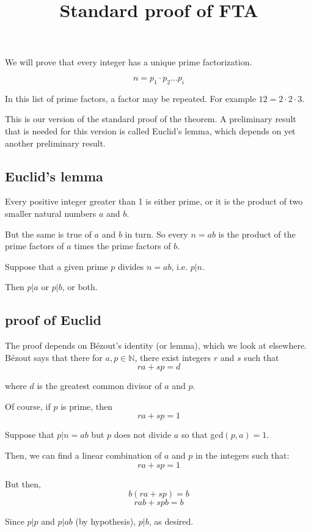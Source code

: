 \documentclass[11pt, oneside]{article}
\title{Standard proof of FTA}
\date{}
\begin{document}
\maketitle
\Large

We will prove that every integer has a unique prime factorization.

\[ n = p_1 \cdot p_2 \dots p_i \]

In this list of prime factors, a factor may be repeated.  For example $12 = 2 \cdot 2 \cdot 3$.

This is our version of the standard proof of the theorem.  A preliminary result that is needed for this version is called Euclid's lemma, which depends on yet another preliminary result.

\subsection*{Euclid's lemma}

Every positive integer greater than 1 is either prime, or it is the product of two smaller natural numbers $a$ and $b$.

But the same is true of $a$ and $b$ in turn.  So every $n = ab$ is the product of the prime factors of $a$ times the prime factors of $b$.

Suppose that a given prime $p$ divides $n=ab$, i.e. $p|n$.

Then $p|a$ or $p|b$, or both.

\subsection*{proof of Euclid}

The proof depends on B\'ezout's identity (or lemma), which we look at elsewhere.  B\'ezout says that there for $a,p \in \mathbb{N}$, there exist integers $r$ and $s$ such that
\[ ra + sp = d \]

where $d$ is the greatest common divisor of $a$ and $p$.

Of course, if $p$ is prime, then
\[ ra + sp = 1 \]

Suppose that $p|n = ab$ but $p$ does not divide $a$ so that gcd$(p,a) = 1$.

Then, we can find a linear combination of $a$ and $p$ in the integers such that:
\[ ra + sp = 1 \]

But then, 
\[ b(ra + sp) = b \]
\[ rab + spb = b \]

Since $p|p$ and $p|ab$ (by hypothesis), $p|b$, as desired.
\end{document}
